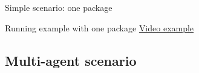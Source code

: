 \begin{frame}[fragile]{Simple scenario: one package}
    
\end{frame}

\begin{frame}{Running example with one package}
    \LARGE
    \centering
    \href{https://youtu.be/a4_tITUTQuQ}{Video example}
\end{frame}

\subsection{Multi-agent scenario}

